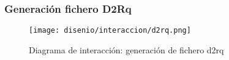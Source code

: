 \subsubsection{Generación fichero D2Rq}

\begin{figure}[H]
    \begin{center}
        \texttt{[image: disenio/interaccion/d2rq.png]}
    \end{center}
    \caption{Diagrama de interacción: generación de fichero d2rq}
    \label{fig:d2rq}
\end{figure}

